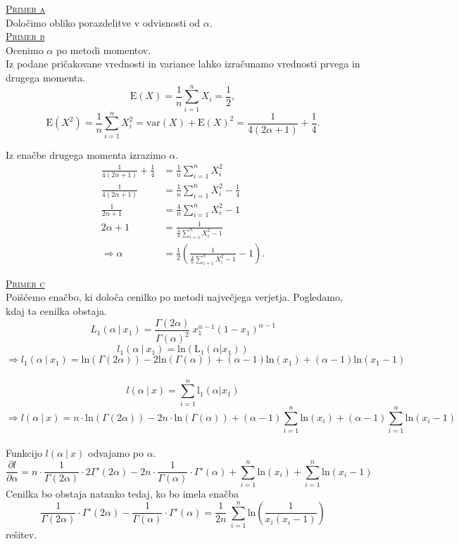 \documentclass[a4paper,12pt]{article}
\begin{document}
\noindent
\textsc{\underline{Primer a}}
\\
Določimo obliko porazdelitve v odvisnosti od $\alpha$.
\\

\noindent
\textsc{\underline{Primer b}}
\\
Ocenimo $\alpha$ po metodi momentov.
\\
Iz podane pričakovane vrednosti in variance lahko izračunamo vrednosti prvega in drugega momenta.
$$ \text{E}(X) = \frac{1}{n} \sum_{i = 1}^{n} X_i = \frac{1}{2}, $$
$$ \text{E}(X^2) = \frac{1}{n} \sum_{i = 1}^{n} X_i^2 = \text{var}(X) + \text{E}(X)^2 = \frac{1}{4(2 \alpha + 1)} + \frac{1}{4}. $$

Iz enačbe drugega momenta izrazimo $\alpha$.
\begin{align*}
    \frac{1}{4(2 \alpha + 1)} + \frac{1}{4} &= \frac{1}{n} \sum_{i = 1}^{n} X_i^2 
    \\
    \frac{1}{4(2 \alpha + 1)} &= \frac{1}{n} \sum_{i = 1}^{n} X_i^2 - \frac{1}{4} 
    \\
    \frac{1}{2 \alpha + 1} &= \frac{4}{n} \sum_{i = 1}^{n} X_i^2 - 1 
    \\
    2 \alpha + 1 &= \frac{1}{\frac{4}{n} \sum_{i = 1}^{n} X_i^2 - 1}
    \\
    \Rightarrow \alpha &= \frac{1}{2} \left( \frac{1}{\frac{4}{n} \sum_{i = 1}^{n} X_i^2 - 1} - 1 \right).
\end{align*}

\noindent
\textsc{\underline{Primer c}}
\\
Poiščemo enačbo, ki določa cenilko po metodi največjega verjetja. Pogledamo, kdaj ta cenilka obstaja.
$$ L_1 (\alpha \ | \ x_1) = \frac{\Gamma (2 \alpha)}{\Gamma (\alpha)^2} \ x_1^{\alpha - 1} (1 - x_1)^{\alpha - 1} $$
$$ l_1 (\alpha \ | \ x_1) = \text{ln}(\text{L}_1 (\alpha | x_1)) $$
$$ \Rightarrow l_1 (\alpha \ | \ x_1) = \text{ln}(\Gamma (2 \alpha)) - 2 \text{ln} (\Gamma (\alpha)) + (\alpha - 1) \text{ln}(x_1) + (\alpha - 1) \text{ln}(x_1 - 1) $$
\\
$$ l (\alpha \ | \ x) = \sum_{i = 1}^{n} \text{l}_1 (\alpha | x_1) $$
$$ \Rightarrow l (\alpha \ | \ x) = n \cdot \text{ln}(\Gamma (2 \alpha)) - 2 n \cdot \text{ln}(\Gamma (\alpha)) + (\alpha - 1) \sum_{i = 1}^{n} \text{ln}(x_i) + (\alpha - 1) \sum_{i = 1}^{n} \text{ln} (x_i - 1)$$
\\
Funkcijo $ l (\alpha \ | \ x) $ odvajamo po $\alpha$.
$$ \frac{\partial l}{\partial \alpha} = n \cdot \frac{1}{\Gamma (2 \alpha)} \cdot 2 \Gamma' (2 \alpha) - 2n \cdot \frac{1}{\Gamma (\alpha)} \cdot \Gamma' (\alpha) + \sum_{i = 1}^{n} \text{ln}(x_i) + \sum_{i = 1}^{n} \text{ln}(x_i - 1)$$
Cenilka bo obstaja natanko tedaj, ko bo imela enačba
 $$ \frac{1}{\Gamma (2 \alpha)} \cdot \Gamma' (2 \alpha) - \frac{1}{\Gamma (\alpha)} \cdot \Gamma' (\alpha) = \frac{1}{2n} \ \sum_{i = 1}^{n} \text{ln} \left( \frac{1}{x_i(x_i - 1)} \right) $$
rešitev.
\end{document}
